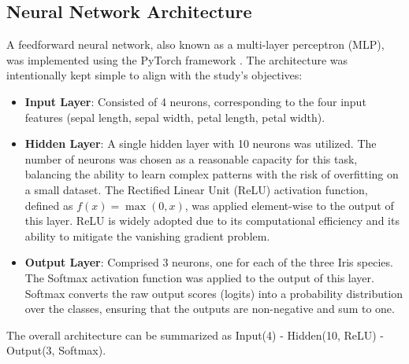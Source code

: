 \documentclass[12pt,a4paper]{article}
\begin{document}
	\subsection{Neural Network Architecture}
	A feedforward neural network, also known as a multi-layer perceptron (MLP), was implemented using the PyTorch framework \cite{pytorch}. The architecture was intentionally kept simple to align with the study's objectives:
	\begin{itemize}
		\item \textbf{Input Layer}: Consisted of 4 neurons, corresponding to the four input features (sepal length, sepal width, petal length, petal width).
		\item \textbf{Hidden Layer}: A single hidden layer with 10 neurons was utilized. The number of neurons was chosen as a reasonable capacity for this task, balancing the ability to learn complex patterns with the risk of overfitting on a small dataset. The Rectified Linear Unit (ReLU) activation function, defined as \(f(x) = \max(0, x)\), was applied element-wise to the output of this layer. ReLU is widely adopted due to its computational efficiency and its ability to mitigate the vanishing gradient problem.
		\item \textbf{Output Layer}: Comprised 3 neurons, one for each of the three Iris species. The Softmax activation function was applied to the output of this layer. Softmax converts the raw output scores (logits) into a probability distribution over the classes, ensuring that the outputs are non-negative and sum to one.
	\end{itemize}
	The overall architecture can be summarized as Input(4) - Hidden(10, ReLU) - Output(3, Softmax).
	
\end{document}
